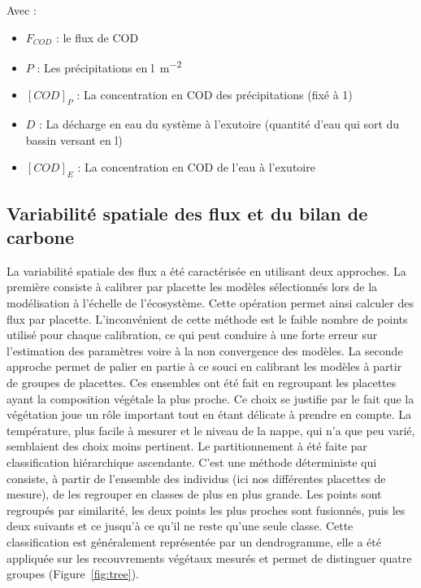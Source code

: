 Avec :
\begin{itemize}
\item $F_{COD}$ : le flux de COD
\item $P$ : Les précipitations en \si{\litre\per\square\metre}
\item $[COD]_{P}$ : La concentration en COD des précipitations (fixé à \SI{1}{\mgl})
\item $D$ : La décharge en eau du système à l'exutoire (quantité d'eau qui sort du bassin versant en \si{\litre})
\item $[COD]_{E}$ : La concentration en COD de l'eau à l'exutoire 
\end{itemize}

\subsection{Variabilité spatiale des flux et du bilan de carbone}

La variabilité spatiale des flux a été caractérisée en utilisant deux approches.
La première consiste à calibrer par placette les modèles sélectionnés lors de la modélisation à l'échelle de l'écosystème.
Cette opération permet ainsi calculer des flux par placette.
L'inconvénient de cette méthode est le faible nombre de points utilisé pour chaque calibration, ce qui peut conduire à une forte erreur sur l'estimation des paramètres voire à la non convergence des modèles.
La seconde approche permet de palier en partie à ce souci en calibrant les modèles à partir de groupes de placettes.
Ces ensembles ont été fait en regroupant les placettes ayant la composition végétale la plus proche.
Ce choix se justifie par le fait que la végétation joue un rôle important tout en étant délicate à prendre en compte.
La température, plus facile à mesurer et le niveau de la nappe, qui n'a que peu varié, semblaient des choix moins pertinent. 
Le partitionnement à été faite par classification hiérarchique ascendante.
C'est une méthode déterministe qui consiste, à partir de l'ensemble des individus (ici nos différentes placettes de mesure), de les regrouper en classes de plus en plus grande.
Les points sont regroupés par similarité, les deux points les plus proches sont fusionnés, puis les deux suivants et ce jusqu'à ce qu'il ne reste qu'une seule classe.
Cette classification est généralement représentée par un dendrogramme, elle a été appliquée sur les recouvrements végétaux mesurés et permet de distinguer quatre groupes (Figure~\ref{fig:tree}).


